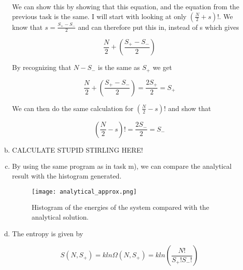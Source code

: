 \documentclass[a4paper,norsk,12pt,oneside]{article}
\begin{document}
\begin{enumerate}[a)]
        We can show this by showing that this equation, and the equation from the previous
        task is the same. 
        I will start with looking at only \(\left (\frac{N}{2} + s \right )!\). 
        We know that \(s = \frac{S_+ - S_-}{2}\) and can therefore put this in,
        instead of s which gives

        \begin{equation*}
            \frac{N}{2} + \left (\frac{S_+ - S_-}{2} \right ) 
        \end{equation*}

        By recognizing that \(N - S_-\) is the same as \(S_+\) we get

        \begin{equation*}
            \frac{N}{2} + \left (\frac{S_+ - S_-}{2} \right ) = \frac{2S_+}{2} = S_+
        \end{equation*}

        We can then do the same calculation for \( \left (\frac{N}{2} - s 
        \right )! \)  and show that

        \begin{equation*}
            \left (\frac{N}{2} - s \right )! = \frac{2S_-}{2} = S_-
        \end{equation*} 

    \item

        CALCULATE STUPID STIRLING HERE!

    \item 
        
        By using the same program as in task m), we can compare the analytical
        result with the histogram generated. 

         \begin{figure}[H]
            \centering %
            \texttt{[image: analytical\_approx.png]}
            \caption{Histogram of the energies of the system compared with the analytical solution.} 
            \end{figure} 


    \item 

        The entropy is given by

        \begin{equation*}
            S(N,S_+) = kln\Omega(N, S_+) = k ln\left ( \frac{N!}{S_+! S_-!} \right )
        \end{equation*}


\end{enumerate}
\end{document}
